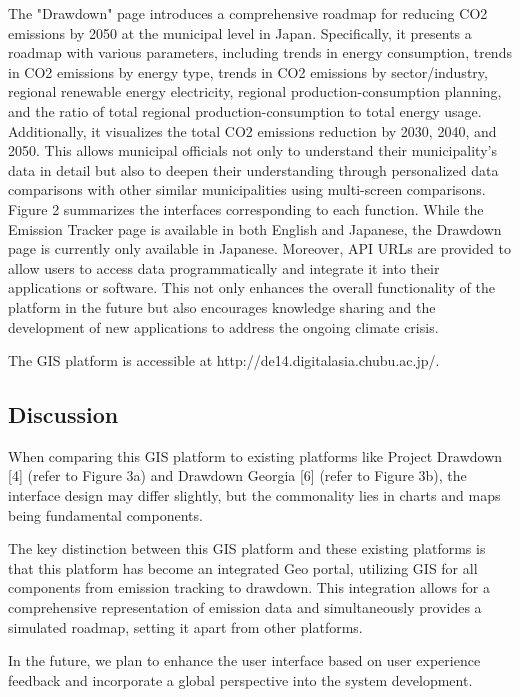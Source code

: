 The "Drawdown" page introduces a comprehensive roadmap for reducing CO2 emissions by 2050 at the municipal level in Japan. Specifically, it presents a roadmap with various parameters, including trends in energy consumption, trends in CO2 emissions by energy type, trends in CO2 emissions by sector/industry, regional renewable energy electricity, regional production-consumption planning, and the ratio of total regional production-consumption to total energy usage. Additionally, it visualizes the total CO2 emissions reduction by 2030, 2040, and 2050. This allows municipal officials not only to understand their municipality's data in detail but also to deepen their understanding through personalized data comparisons with other similar municipalities using multi-screen comparisons. Figure 2 summarizes the interfaces corresponding to each function. While the Emission Tracker page is available in both English and Japanese, the Drawdown page is currently only available in Japanese. Moreover, API URLs are provided to allow users to access data programmatically and integrate it into their applications or software. This not only enhances the overall functionality of the platform in the future but also encourages knowledge sharing and the development of new applications to address the ongoing climate crisis. \par
The GIS platform is accessible at http://de14.digitalasia.chubu.ac.jp/.\par
\subsection{Discussion}

When comparing this GIS platform to existing platforms like Project Drawdown [4] (refer to Figure 3a) and Drawdown Georgia [6] (refer to Figure 3b), the interface design may differ slightly, but the commonality lies in charts and maps being fundamental components.\par

The key distinction between this GIS platform and these existing platforms is that this platform has become an integrated Geo portal, utilizing GIS for all components from emission tracking to drawdown. This integration allows for a comprehensive representation of emission data and simultaneously provides a simulated roadmap, setting it apart from other platforms.\par
In the future, we plan to enhance the user interface based on user experience feedback and incorporate a global perspective into the system development.\par